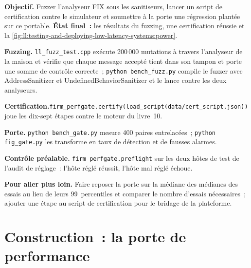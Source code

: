\begin{tutorial}
\textbf{Objectif.} Fuzzer l'analyseur FIX sous les sanitiseurs, lancer un script de certification contre le simulateur et soumettre à la porte une
régression plantée sur ce portable. \textbf{État final~:} les résultats du fuzzing, une certification réussie et la
\cref{fig:ll:testing-and-deploying-low-latency-systems:power}.
\begin{tutsteps} \sloppy
\item \textbf{Fuzzing.} \texttt{ll\_fuzz\_test.cpp} exécute 200\,000 mutations à travers l'analyseur de la maison et vérifie que chaque
message accepté tient dans son tampon et porte une somme de contrôle correcte~; \texttt{python bench\_fuzz.py} compile le fuzzer avec AddressSanitizer et
UndefinedBehaviorSanitizer et le lance contre les deux analyseurs.
\item \textbf{Certification.}\newline \texttt{firm\_perfgate.certify(load\_script(\textquotedbl{}data/cert\_script.json\textquotedbl{}))}
joue les dix-sept étapes contre le moteur du livre~10.
\item \textbf{Porte.} \texttt{python bench\_gate.py} mesure 400 paires entrelacées~; \texttt{python fig\_gate.py} les transforme
en taux de détection et de fausses alarmes.
\item \textbf{Contrôle préalable.} \texttt{firm\_perfgate.preflight} sur les deux hôtes de test de l'audit de réglage~: l'hôte réglé réussit, l'hôte
mal réglé échoue.
\end{tutsteps}
\textbf{Pour aller plus loin.} Faire reposer la porte sur la médiane des médianes des essais au lieu de leurs 99~percentiles et comparer le nombre
d'essais nécessaires~; ajouter une étape au script de certification pour le bridage de la plateforme.
\end{tutorial}

\section{Construction~: la porte de performance}\label{bld:ll:testing-and-deploying-low-latency-systems:perfgate}

